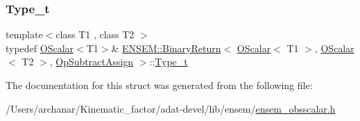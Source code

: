 \mbox{\label{structENSEM_1_1BinaryReturn_3_01OScalar_3_01T1_01_4_00_01OScalar_3_01T2_01_4_00_01OpSubtractAssign_01_4_a56c648d7318d544c513534130a020867}} 
\subsubsection{\texorpdfstring{Type\_t}{Type\_t}\hspace{0.1cm}{\footnotesize\ttfamily [3/3]}}
{\footnotesize\ttfamily template$<$class T1 , class T2 $>$ \\
typedef \mbox{\hyperlink{classENSEM_1_1OScalar}{O\+Scalar}}$<$T1$>$\& \mbox{\hyperlink{structENSEM_1_1BinaryReturn}{E\+N\+S\+E\+M\+::\+Binary\+Return}}$<$ \mbox{\hyperlink{classENSEM_1_1OScalar}{O\+Scalar}}$<$ T1 $>$, \mbox{\hyperlink{classENSEM_1_1OScalar}{O\+Scalar}}$<$ T2 $>$, \mbox{\hyperlink{structENSEM_1_1OpSubtractAssign}{Op\+Subtract\+Assign}} $>$\+::\mbox{\hyperlink{structENSEM_1_1BinaryReturn_3_01OScalar_3_01T1_01_4_00_01OScalar_3_01T2_01_4_00_01OpSubtractAssign_01_4_a56c648d7318d544c513534130a020867}{Type\+\_\+t}}}



The documentation for this struct was generated from the following file\+:\begin{DoxyCompactItemize}
\item 
/\+Users/archanar/\+Kinematic\+\_\+factor/adat-\/devel/lib/ensem/\mbox{\hyperlink{adat-devel_2lib_2ensem_2ensem__obsscalar_8h}{ensem\+\_\+obsscalar.\+h}}\end{DoxyCompactItemize}
